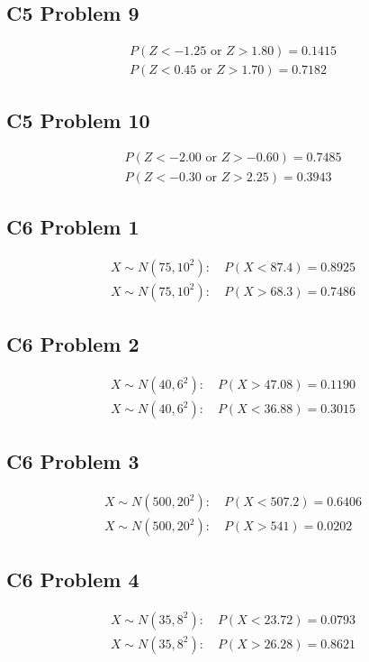 	\subsection{C5 Problem 9}
	\[
	\begin{array}{l}
	P(Z<-1.25\text{ or }Z>1.80)=0.1415\\
	P(Z<0.45\text{ or }Z>1.70)=0.7182
	\end{array}
	\]

	\subsection{C5 Problem 10}
	\[
	\begin{array}{l}
	P(Z<-2.00\text{ or }Z>-0.60)=0.7485\\
	P(Z<-0.30\text{ or }Z>2.25)=0.3943
	\end{array}
	\]

	\subsection{C6 Problem 1}
	\[
	\begin{array}{l}
	X\sim N(75,10^2):\quad P(X<87.4)=0.8925\\
	X\sim N(75,10^2):\quad P(X>68.3)=0.7486
	\end{array}
	\]

	\subsection{C6 Problem 2}
	\[
	\begin{array}{l}
	X\sim N(40,6^2):\quad P(X>47.08)=0.1190\\
	X\sim N(40,6^2):\quad P(X<36.88)=0.3015
	\end{array}
	\]

	\subsection{C6 Problem 3}
	\[
	\begin{array}{l}
	X\sim N(500,20^2):\quad P(X<507.2)=0.6406\\
	X\sim N(500,20^2):\quad P(X>541)=0.0202
	\end{array}
	\]

	\subsection{C6 Problem 4}
	\[
	\begin{array}{l}
	X\sim N(35,8^2):\quad P(X<23.72)=0.0793\\
	X\sim N(35,8^2):\quad P(X>26.28)=0.8621
	\end{array}
	\]

